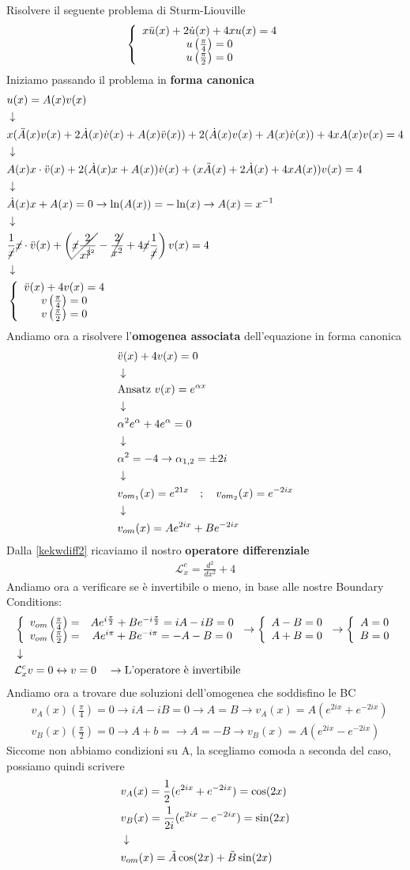 Risolvere il seguente problema di Sturm-Liouville
\begin{align}
	\left\{ \begin{array}{ccc} x \ddot{u}(x) + 2 \dot{u}(x) + 4xu(x) = 4\\ u \left( \frac{\pi}{4}\right)=0\\ u \left( \frac{\pi}{2}\right)=0 \end{array} \right.
\end{align}
Iniziamo passando il problema in \textbf{forma canonica}
\begin{align}
	&u(x) = A(x)v(x) \\ &\downarrow \nonumber \\
	&x(\ddot{A}(x)v(x) + 2\dot{A}(x) \dot{v}(x) + A(x) \ddot{v}(x)) + 2(\dot{A}(x)v(x) + A(x) \dot{v}(x)) + 4xA(x)v(x) = 4 \nonumber \\ &\downarrow \nonumber \\
	&A(x)x \cdot \ddot{v}(x) + 2(\dot{A}(x)x + A(x)) \dot{v}(x) + (x \ddot{A}(x) + 2 \dot{A}(x) + 4xA(x)) v(x) = 4 \nonumber \\ &\downarrow \nonumber \\
	&\dot{A}(x)x + A(x)=0 \to \ln(A(x)) = -\ln(x) \to A(x)= x^{-1}\nonumber \\ &\downarrow \nonumber \\
	&\frac{1}{\cancel{x}} \cancel{x}\cdot \ddot{v}(x) + \left( \cancel{\cancel{x} \frac{2}{x^{\cancel{3}^2}}} - \cancel{\frac{2}{x^2}} + 4\cancel{x} \frac{1}{\cancel{x}} \right)v(x) = 4 \nonumber \\ &\downarrow \nonumber \\
	&\left\{ \begin{array}{ccc} \ddot{v}(x) + 4v(x)= 4\\ v \left( \frac{\pi}{4}\right)=0\\ v \left( \frac{\pi}{2}\right)=0 \end{array} \right. \label{kekwdiff2}
\end{align}
Andiamo ora a risolvere l'\textbf{omogenea associata} dell'equazione in forma canonica
\begin{align}
	&\ddot{v}(x) + 4v(x) = 0 \\ &\downarrow \nonumber \\
	&\text{Ansatz } v(x)= e^{\alpha x} \nonumber \\ &\downarrow \nonumber \\
	&\alpha^2 e^{\alpha} + 4 e^{\alpha} = 0 \nonumber \\ &\downarrow \nonumber \\
	&\alpha^2 = -4 \to \alpha_{1,2} = \pm 2i \nonumber \\ &\downarrow \nonumber \\
	&v_{{om}_1}(x) = e^{21x} \quad ; \quad v_{{om}_2}(x) = e^{-2ix} \nonumber \\ &\downarrow \nonumber \\
	&v_{{om}}(x) = Ae^{2ix} + Be^{-2ix}
\end{align}
Dalla \ref{kekwdiff2} ricaviamo il nostro \textbf{operatore differenziale}
\begin{align}
	\mathcal{L}_x^c = \frac{d^2}{dx^2} + 4
\end{align}
Andiamo ora a verificare se è invertibile o meno, in base alle nostre Boundary Conditions:
\begin{align}
	&\left\{ \begin{array}{cc} v_{om}\left( \frac{\pi}{4}\right) =& Ae^{i\frac{\pi}{2}} + Be^{-i\frac{\pi}{2}}=iA-iB = 0\\ v_{om}\left( \frac{\pi}{2}\right) =& Ae^{i\pi} + Be^{-i\pi} =-A -B = 0 \end{array} \right. \to \left\{ \begin{array}{cc} A-B=0\\ A+B=0 \end{array} \right. \to \left\{ \begin{array}{cc} A=0\\ B=0 \end{array} \right.\\ &\downarrow \nonumber \\
	&\mathcal{L}_x^c v=0 \leftrightarrow v=0 \quad \to \text{L'operatore è invertibile}
\end{align}
Andiamo ora a trovare due soluzioni dell'omogenea che soddisfino le BC
\begin{align}
	&v_A(x) \left( \frac{\pi}{4}\right) =0 \to iA - iB = 0 \to A=B \to v_A(x) = A(e^{2ix} + e^{-2ix}) \\
	&v_B(x) \left( \frac{\pi}{2}\right) =0 \to A+b = \to A=-B \to v_B(x) = A(e^{2ix} - e^{-2ix})
\end{align}
Siccome non abbiamo condizioni su A, la scegliamo comoda a seconda del caso, possiamo quindi scrivere
\begin{align}
	&v_A(x) = \frac{1}{2}(e^{2ix} + e^{-2ix}) = \cos(2x) \\
	&v_B(x) = \frac{1}{2i}(e^{2ix} - e^{-2ix}) = \sin(2x)\\ &\downarrow \nonumber \\
	& v_{om}(x) = \tilde{A} \cos(2x) + \tilde{B} \sin(2x) 
\end{align}

